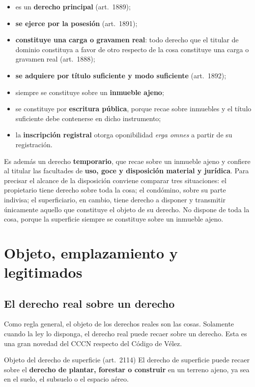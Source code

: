 \documentclass[12pt,oneside]{book}
\begin{document}
\begin{itemize}
    \item es un \textbf{derecho principal} (art.~1889);
    \item \textbf{se ejerce por la posesión} (art.~1891);
    \item \textbf{constituye una carga o gravamen real}: todo derecho que el titular de dominio constituya a favor de otro respecto de la cosa constituye una carga o gravamen real (art.~1888);
    \item \textbf{se adquiere por título suficiente y modo suficiente} (art.~1892);
    \item siempre se constituye sobre un \textbf{inmueble ajeno};
    \item se constituye por \textbf{escritura pública}, porque recae sobre inmuebles y el título suficiente debe contenerse en dicho instrumento;
    \item la \textbf{inscripción registral} otorga oponibilidad \textit{erga omnes} a partir de su registración.
\end{itemize}

Es además un derecho \textbf{temporario}, que recae sobre un inmueble ajeno y confiere al titular las facultades de \textbf{uso, goce y disposición material y jurídica}. Para precisar el alcance de la disposición conviene comparar tres situaciones: el propietario tiene derecho sobre toda la cosa; el condómino, sobre su parte indivisa; el superficiario, en cambio, tiene derecho a disponer y transmitir únicamente aquello que constituye el objeto de su derecho. No dispone de toda la cosa, porque la superficie siempre se constituye sobre un inmueble ajeno.

\section{Objeto, emplazamiento y legitimados}

\subsection{El derecho real sobre un derecho}

Como regla general, el objeto de los derechos reales son las cosas. Solamente cuando la ley lo disponga, el derecho real puede recaer sobre un derecho. Esta es una gran novedad del CCCN respecto del Código de Vélez.

\begin{definicion}{Objeto del derecho de superficie (art.~2114)}
El derecho de superficie puede recaer sobre el \textbf{derecho de plantar, forestar o construir} en un terreno ajeno, ya sea en el suelo, el subsuelo o el espacio aéreo.
\end{definicion}
\end{document}
